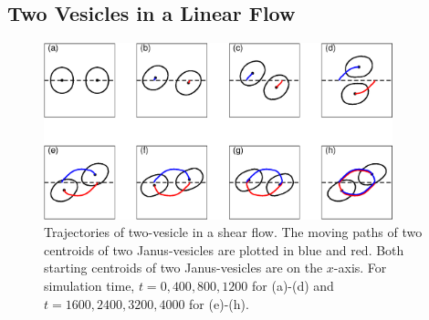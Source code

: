 \documentclass[lineno]{jfm}
\begin{document}
\subsection{Two Vesicles in a Linear Flow}


\begin{figure}
\begin{center}
\includegraphics[width=0.9\textwidth]{ShearTraj.eps}
\end{center} 
  \caption{Trajectories of two-vesicle in a shear flow. The moving paths of two centroids of two Janus-vesicles are plotted in blue and red. Both starting centroids of two Janus-vesicles are on the $x$-axis. 
For simulation time, $t = {0, 400,800,1200}$ for (a)-(d) and $t = {1600, 2400, 3200, 4000}$ for (e)-(h).}
    \label{figure9}
\end{figure}
\end{document}
